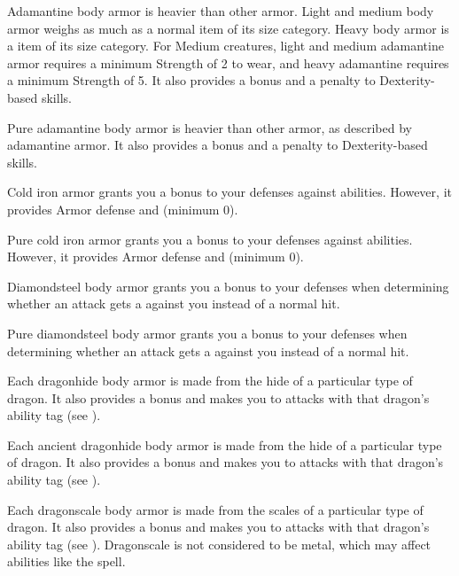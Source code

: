        Adamantine body armor is heavier than other armor.
      Light and medium body armor weighs as much as a normal item of its size category.
      Heavy body armor is a  item of its size category.
      For Medium creatures, light and medium adamantine armor requires a minimum Strength of 2 to wear, and heavy adamantine requires a minimum Strength of 5.
      It also provides a   bonus and a  penalty to Dexterity-based skills.

       Pure adamantine body armor is heavier than other armor, as described by adamantine armor.
      It also provides a   bonus and a  penalty to Dexterity-based skills.

       Cold iron armor grants you a  bonus to your defenses against \magical abilities.
      However, it provides  Armor defense and   (minimum 0).

       Pure cold iron armor grants you a  bonus to your defenses against \magical abilities.
      However, it provides  Armor defense and   (minimum 0).

       Diamondsteel body armor grants you a  bonus to your defenses when determining whether an attack gets a  against you instead of a normal hit.

       Pure diamondsteel body armor grants you a  bonus to your defenses when determining whether an attack gets a  against you instead of a normal hit.

       Each dragonhide body armor is made from the hide of a particular type of dragon.
      It also provides a   bonus and makes you  to attacks with that dragon's ability tag (see ).

       Each ancient dragonhide body armor is made from the hide of a particular type of dragon.
      It also provides a   bonus and makes you  to attacks with that dragon's ability tag (see ).

       Each dragonscale body armor is made from the scales of a particular type of dragon.
      It also provides a   bonus and makes you  to attacks with that dragon's ability tag (see ).
      Dragonscale is not considered to be metal, which may affect abilities like the  spell.


